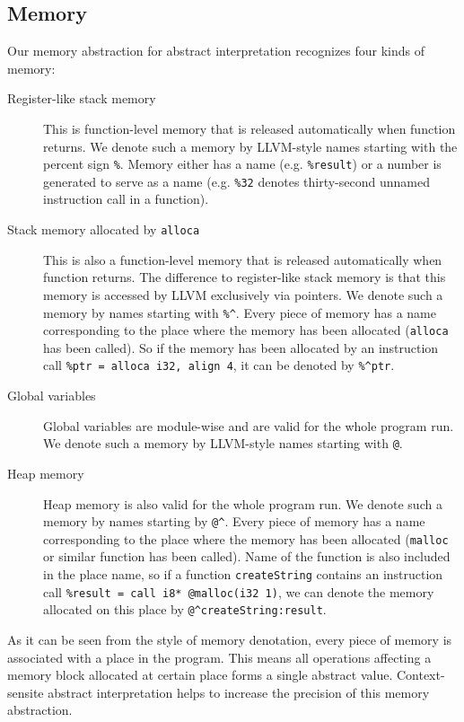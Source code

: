 \documentclass{article}
\begin{document}
\subsection{Memory}
Our memory abstraction for abstract interpretation recognizes four
kinds of memory:
\begin{description}
\item[Register-like stack memory] This is function-level memory that
  is released automatically when function returns.  We denote such a
  memory by LLVM-style names starting with the percent sign
  \texttt{\%}.  Memory either has a name (e.g. \texttt{\%result}) or a
  number is generated to serve as a name (e.g. \texttt{\%32} denotes
  thirty-second unnamed instruction call in a function).
\item[Stack memory allocated by \texttt{alloca}] This is also a
  function-level memory that is released automatically when function
  returns.  The difference to register-like stack memory is that this
  memory is accessed by LLVM exclusively via pointers.  We denote such
  a memory by names starting with \texttt{\%\^}.  Every piece of
  memory has a name corresponding to the place where the memory has
  been allocated (\texttt{alloca} has been called).  So if the memory
  has been allocated by an instruction call \texttt{\%ptr = alloca
    i32, align 4}, it can be denoted by \texttt{\%\^{}ptr}.
\item[Global variables] Global variables are module-wise and are valid
  for the whole program run.  We denote such a memory by LLVM-style
  names starting with \texttt{@}.
\item[Heap memory] Heap memory is also valid for the whole program
  run.  We denote such a memory by names starting by \texttt{@\^}.
  Every piece of memory has a name corresponding to the place where
  the memory has been allocated (\texttt{malloc} or similar function
  has been called).  Name of the function is also included in the
  place name, so if a function \texttt{createString} contains an
  instruction call \texttt{\%result = call i8* @malloc(i32 1)}, we can
  denote the memory allocated on this place by
  \texttt{@\^{}createString:result}.
\end{description}

As it can be seen from the style of memory denotation, every piece of
memory is associated with a place in the program.  This means all
operations affecting a memory block allocated at certain place forms a
single abstract value.  Context-sensite abstract interpretation helps
to increase the precision of this memory abstraction.
\end{document}
